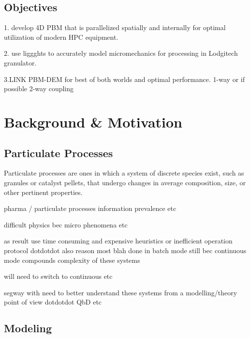 \documentclass[preprint,11pt,authoryear]{elsarticle}
\begin{document}
	    \subsection{Objectives}
	    \par 1. develop 4D PBM that is parallelized spatially and internally for optimal utilization of modern HPC equipment.
	    \par 2. use liggghts to accurately model micromechanics for processing in Lodgitech granulator. 
	    \par 3.LINK PBM-DEM for best of both worlds and optimal performance.  1-way or if possible 2-way coupling
	

	\section{Background \& Motivation}
	
	  \subsection{Particulate Processes}
	  \par Particulate processes are ones in which a system of discrete species exist, such as granules or catalyst pellets, that undergo changes in average composition, size, or other pertinent properties.
  \par pharma / particulate processes information prevalence etc
  \par difficult physics bec micro phenomena etc 
  \par as result use time consuming and expensive heuristics or inefficient operation protocol  dotdotdot also reason most blah done in batch mode still bec continuous mode compounds complexity of these systems \par will need to switch to continuous etc  
  \par segway with need to better understand these systems from a modelling/theory point of view dotdotdot QbD etc 
	  
	  \subsection{Modeling}
\end{document}
